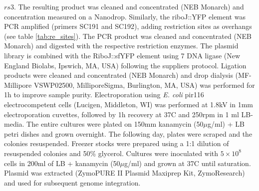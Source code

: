 $rs3$. The resulting product was cleaned and concentrated (NEB Monarch) and concentration measured on a Nanodrop. Similarly, the riboJ::YFP element was PCR amplified (primers SC191 and SC192), adding restriction sites as overhangs (see table \ref{tab:re_sites}). The PCR product was cleaned and concentrated (NEB Monarch) and digested with the respective restriction enzymes. The plasmid library is combined with the RiboJ::sfYFP element using 7 DNA ligase (New England Biolabs, Ipswich, MA, USA) following the suppliers protocol. Ligation products were cleaned and concentrated (NEB Monarch) and drop dialysis (MF-Millipore VSWP02500, MilliporeSigma, Burlington, MA, USA)  was performed for 1h to improve sample purity. Electroporation using \textit{E. coli} pir116 electrocompetent cells (Lucigen, Middleton, WI) was performed at 1.8kV in 1mm electroporation cuvettes, followed by 1h recovery at 37C and 250rpm in 1 ml LB-media. The entire cultures were plated on 150mm kanamycin (50$\mu$g/ml) + LB petri dishes and grown overnight. The following day, plates were scraped and the colonies resuspended. Freezer stocks were prepared using a 1:1 dilution of resuspended colonies and 50\% glycerol. Cultures were inoculated with $5\times 10^8$ cells in 200ml of LB + kanamycin (50$\mu$g/ml) and grown at 37C until saturation. Plasmid was extracted (ZymoPURE II Plasmid Maxiprep Kit, ZymoResearch) and used for subsequent genome integration. 



